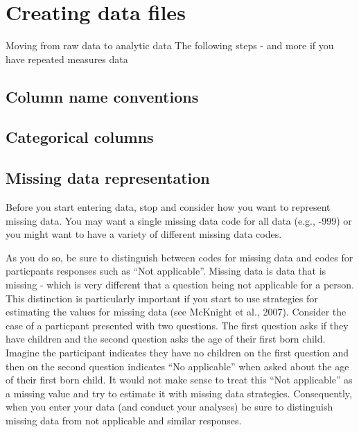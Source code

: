 \documentclass[
]{krantz}
\begin{document}
\hypertarget{creating-data-files}{%
\section{Creating data files}\label{creating-data-files}}

Moving from raw data to analytic data
The following steps - and more if you have repeated measures data

\hypertarget{column-name-conventions}{%
\subsection{Column name conventions}\label{column-name-conventions}}

\hypertarget{categorical-columns}{%
\subsection{Categorical columns}\label{categorical-columns}}

\hypertarget{missing-data-representation}{%
\subsection{Missing data representation}\label{missing-data-representation}}

Before you start entering data, stop and consider how you want to represent missing data. You may want a single missing data code for all data (e.g., -999) or you might want to have a variety of different missing data codes.

As you do so, be sure to distinguish between codes for missing data and codes for particpants responses such as ``Not applicable''. Missing data is data that is missing - which is very different that a question being not applicable for a person. This distinction is particularly important if you start to use strategies for estimating the values for missing data (see McKnight et al., 2007). Consider the case of a particpant presented with two questions. The first question asks if they have children and the second question asks the age of their first born child. Imagine the participant indicates they have no children on the first question and then on the second question indicates ``No applicable'' when asked about the age of their first born child. It would not make sense to treat this ``Not applicable'' as a missing value and try to estimate it with missing data strategies. Consequently, when you enter your data (and conduct your analyses) be sure to distinguish missing data from not applicable and similar responses.
\end{document}
